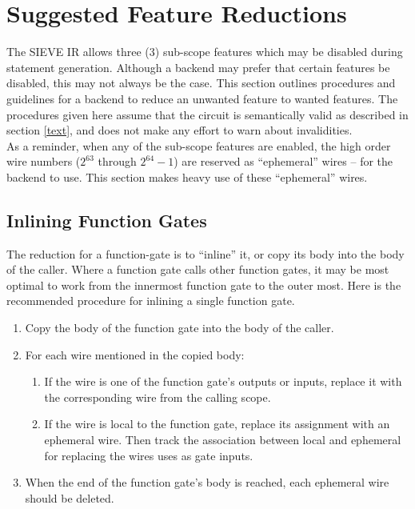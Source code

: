 
\section{Suggested Feature Reductions}\label{flattening}

The SIEVE IR allows three (3) sub-scope features which may be disabled during statement generation.
Although a backend may prefer that certain features be disabled, this may not always be the case.
This section outlines procedures and guidelines for a backend to reduce an unwanted feature to wanted features.
The procedures given here assume that the circuit is semantically valid as described in section \ref{text}, and does not make any effort to warn about invalidities.\\

As a reminder, when any of the sub-scope features are enabled, the high order wire numbers ($2^{63}$ through $2^{64}-1$) are reserved as ``ephemeral'' wires -- for the backend to use.
This section makes heavy use of these ``ephemeral'' wires.\\

\subsection{Inlining Function Gates}\label{inlining}
The reduction for a function-gate is to ``inline'' it, or copy its body into the body of the caller.
Where a function gate calls other function gates, it may be most optimal to work from the innermost function gate to the outer most.
Here is the recommended procedure for inlining a single function gate.\\

\begin{enumerate}
    \item Copy the body of the function gate into the body of the caller.
    \item For each wire mentioned in the copied body:
    \begin{enumerate}
        \item If the wire is one of the function gate's outputs or inputs, replace it with the corresponding wire from the calling scope.
        \item If the wire is local to the function gate, replace its assignment with an ephemeral wire.
        Then track the association between local and ephemeral for replacing the wires uses as gate inputs.
    \end{enumerate}
    \item When the end of the function gate's body is reached, each ephemeral wire should be deleted.
\end{enumerate}

